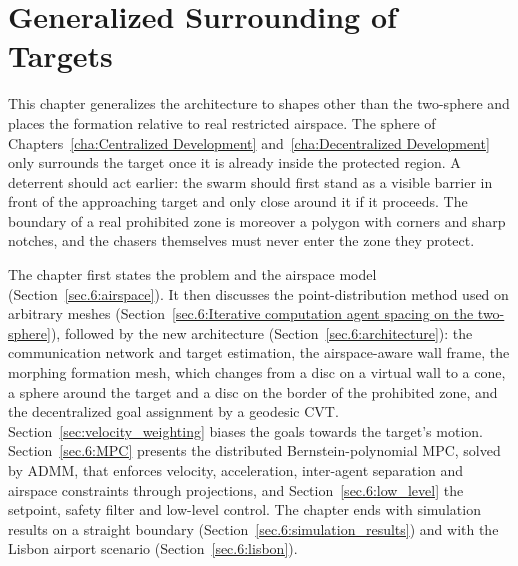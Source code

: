 
%

\chapter{Generalized Surrounding of Targets}
\label{cha:Generalized Development}

\glsresetall

This chapter generalizes the architecture to shapes other than the two-sphere and places the formation relative to real restricted airspace. The sphere of Chapters~\ref{cha:Centralized Development} and~\ref{cha:Decentralized Development} only surrounds the target once it is already inside the protected region. A deterrent should act earlier: the swarm should first stand as a visible barrier in front of the approaching target and only close around it if it proceeds. The boundary of a real prohibited zone is moreover a polygon with corners and sharp notches, and the chasers themselves must never enter the zone they protect.

The chapter first states the problem and the airspace model (Section~\ref{sec.6:airspace}). It then discusses the point-distribution method used on arbitrary meshes (Section~\ref{sec.6:Iterative computation agent spacing on the two-sphere}), followed by the new architecture (Section~\ref{sec.6:architecture}): the communication network and target estimation, the airspace-aware wall frame, the morphing formation mesh, which changes from a disc on a virtual wall to a cone, a sphere around the target and a disc on the border of the prohibited zone, and the decentralized goal assignment by a geodesic \gls{CVT}. Section~\ref{sec:velocity_weighting} biases the goals towards the target's motion. Section~\ref{sec.6:MPC} presents the distributed Bernstein-polynomial \gls{MPC}, solved by \gls{ADMM}, that enforces velocity, acceleration, inter-agent separation and airspace constraints through projections, and Section~\ref{sec.6:low_level} the setpoint, safety filter and low-level control. The chapter ends with simulation results on a straight boundary (Section~\ref{sec.6:simulation_results}) and with the Lisbon airport scenario (Section~\ref{sec.6:lisbon}).

